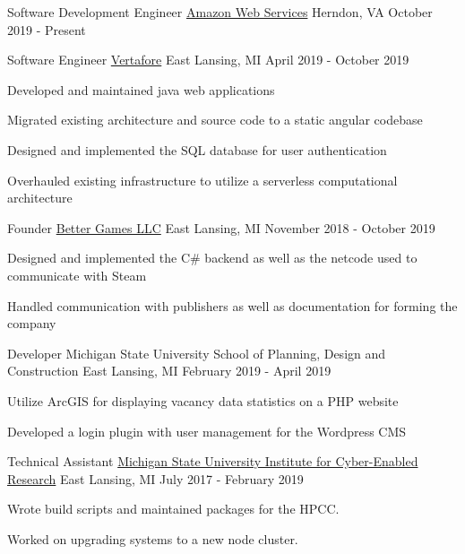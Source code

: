 
\begin{cventries}

  \cventry
    {Software Development Engineer} %
    {\href{https://aws.amazon.com}{Amazon Web Services}} %
    {Herndon, VA} %
    {October 2019 - Present} %
    {
      \begin{cvitems}
      \end{cvitems}
    }

  \cventry
    {Software Engineer}
    {\href{https://www.vertafore.com}{Vertafore}}
    {East Lansing, MI}
    {April 2019 - October 2019}
    {
      \begin{cvitems}
        \item {Developed and maintained java web applications}
        \item {Migrated existing architecture and source code to a static angular codebase}
        \item {Designed and implemented the SQL database for user authentication}
        \item {Overhauled existing infrastructure to utilize a serverless computational architecture}
      \end{cvitems}
    }

  \cventry
    {Founder}
    {\href{https://better-games.org}{Better Games LLC}}
    {East Lansing, MI}
    {November 2018 - October 2019}
    {
      \begin{cvitems}
        \item {Designed and implemented the C\# backend as well as the netcode used to communicate with Steam}
        \item {Handled communication with publishers as well as documentation for forming the company}
      \end{cvitems}
    }

  \cventry
  {Developer}
  {Michigan State University School of Planning, Design and Construction}
  {East Lansing, MI}
  {February 2019 - April 2019}
  {
    \begin{cvitems}
      \item {Utilize ArcGIS for displaying vacancy data statistics on a PHP website}
      \item {Developed a login plugin with user management for the Wordpress CMS}
    \end{cvitems}
  }

  \cventry
    {Technical Assistant}
    {\href{https://icer.msu.edu}{Michigan State University Institute for Cyber-Enabled Research}}
    {East Lansing, MI}
    {July 2017 - February 2019}
    {
      \begin{cvitems}
        \item {Wrote build scripts and maintained packages for the HPCC.}
        \item {Worked on upgrading systems to a new node cluster.}
      \end{cvitems}
    }


\end{cventries}
